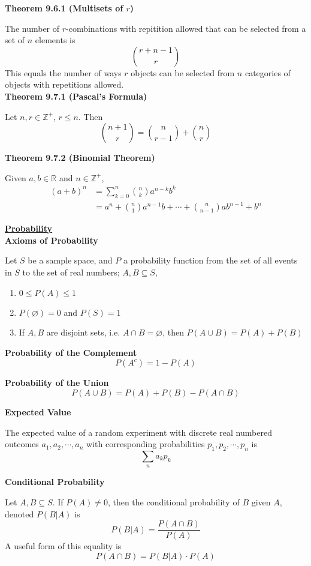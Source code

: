 \documentclass[a4paper]{article}
\newcommand{\heading}[1]{{\small\underline{\textbf{#1}}}}
\newcommand{\subheading}[1]{{\scriptsize\textbf{#1}}}
\begin{document}
\begin{multicols*}{4}
\subheading{Theorem 9.6.1 (Multisets of $r$)}

The number of $r$-combinations with repitition allowed that can be selected from
a set of $n$ elements is $$\binom{r+n-1}{r}$$
This equals the number of ways $r$ objects can be selected from $n$ categories
of objects with repetitions allowed.\\

\subheading{Theorem 9.7.1 (Pascal's Formula)}

Let $n, r \in \mathbb{Z}^+$, $r \leq n$. Then
$$\binom{n+1}{r} = \binom{n}{r-1} + \binom{n}{r}$$

\subheading{Theorem 9.7.2 (Binomial Theorem)}

Given $a, b \in \mathbb{R}$ and $n \in \mathbb{Z}^+$,
\begin{align*}
  (a + b)^n &= \sum^n_{k=0} \binom{n}{k} a^{n-k}b^k \\
    &= a^n + \binom{n}{1}a^{n-1}b + \cdots + \binom{n}{n-1}ab^{n-1} + b^n
\end{align*}

\heading{Probability}\\

\subheading{Axioms of Probability}

Let $S$ be a sample space, and $P$ a probability function from the set of all
events in $S$ to the set of real numbers; $A, B \subseteq S$,

\begin{enumerate} \itemsep -0.5em
  \item $0 \leq P(A) \leq 1$
  \item $P(\varnothing) = 0$ and $P(S) = 1$
  \item If $A, B$ are disjoint sets, i.e. $A \cap B = \varnothing$, then $P(A
    \cup B) = P(A) + P(B)$
\end{enumerate}

\subheading{Probability of the Complement}
$$P(A^c) = 1 - P(A)$$

\subheading{Probability of the Union}
$$P(A \cup B) = P(A) + P(B) - P(A \cap B)$$

\subheading{Expected Value}

The expected value of a random experiment with discrete real numbered outcomes
$a_1, a_2, \cdots, a_n$ with corresponding probabilities $p_1, p_2, \cdots, p_n$
is
$$\sum_n a_kp_k$$

\subheading{Conditional Probability}

Let $A, B \subseteq S$. If $P(A) \neq 0$, then the conditional probability of
$B$ given $A$, denoted $P(B|A)$ is $$P(B|A)=\frac{P(A \cap B)}{P(A)}$$
A useful form of this equality is $$P(A \cap B) = P(B|A) \cdot P(A)$$


\end{multicols*}
\end{document}
